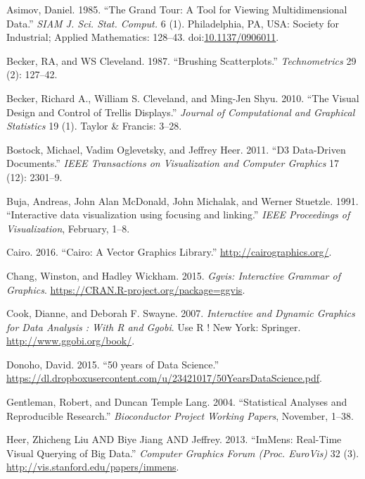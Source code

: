 \documentclass[12pt,]{article}
\theoremstyle{definition}
\theoremstyle{definition}
\theoremstyle{remark}
\begin{document}
\hypertarget{ref-grand-tour}{}
Asimov, Daniel. 1985. ``The Grand Tour: A Tool for Viewing
Multidimensional Data.'' \emph{SIAM J. Sci. Stat. Comput.} 6 (1).
Philadelphia, PA, USA: Society for Industrial; Applied Mathematics:
128--43. doi:\href{https://doi.org/10.1137/0906011}{10.1137/0906011}.

\hypertarget{ref-brushing-scatterplots}{}
Becker, RA, and WS Cleveland. 1987. ``Brushing Scatterplots.''
\emph{Technometrics} 29 (2): 127--42.

\hypertarget{ref-trellis}{}
Becker, Richard A., William S. Cleveland, and Ming-Jen Shyu. 2010. ``The
Visual Design and Control of Trellis Displays.'' \emph{Journal of
Computational and Graphical Statistics} 19 (1). Taylor \& Francis:
3--28.

\hypertarget{ref-d3}{}
Bostock, Michael, Vadim Oglevetsky, and Jeffrey Heer. 2011. ``D3
Data-Driven Documents.'' \emph{IEEE Transactions on Visualization and
Computer Graphics} 17 (12): 2301--9.

\hypertarget{ref-Buja:1991vh}{}
Buja, Andreas, John Alan McDonald, John Michalak, and Werner Stuetzle.
1991. ``Interactive data visualization using focusing and linking.''
\emph{IEEE Proceedings of Visualization}, February, 1--8.

\hypertarget{ref-cairo}{}
Cairo. 2016. ``Cairo: A Vector Graphics Library.''
\url{http://cairographics.org/}.

\hypertarget{ref-ggvis}{}
Chang, Winston, and Hadley Wickham. 2015. \emph{Ggvis: Interactive
Grammar of Graphics}. \url{https://CRAN.R-project.org/package=ggvis}.

\hypertarget{ref-ggobi:2007}{}
Cook, Dianne, and Deborah F. Swayne. 2007. \emph{Interactive and Dynamic
Graphics for Data Analysis : With R and Ggobi}. Use R ! New York:
Springer. \url{http://www.ggobi.org/book/}.

\hypertarget{ref-Donoho:2015tu}{}
Donoho, David. 2015. ``50 years of Data Science.''
\url{https://dl.dropboxusercontent.com/u/23421017/50YearsDataScience.pdf}.

\hypertarget{ref-Gentleman:Lang}{}
Gentleman, Robert, and Duncan Temple Lang. 2004. ``Statistical Analyses
and Reproducible Research.'' \emph{Bioconductor Project Working Papers},
November, 1--38.

\hypertarget{ref-2013-immens}{}
Heer, Zhicheng Liu AND Biye Jiang AND Jeffrey. 2013. ``ImMens: Real-Time
Visual Querying of Big Data.'' \emph{Computer Graphics Forum (Proc.
EuroVis)} 32 (3). \url{http://vis.stanford.edu/papers/immens}.
\end{document}
